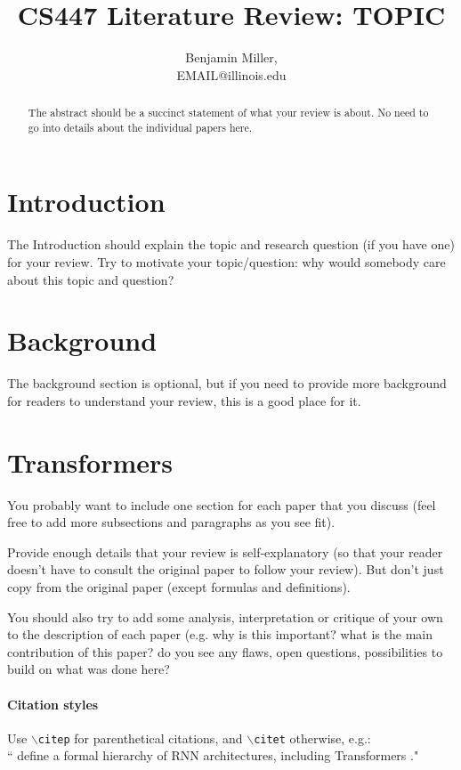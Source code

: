 \documentclass[letterpaper, 11pt]{article}
\title{CS447 Literature Review: TOPIC}
\author{Benjamin Miller,\\ EMAIL@illinois.edu}
\begin{document}
\maketitle

\begin{abstract}
The abstract should be a succinct statement of what your review is about. No need to go into details about the individual papers here. 
\end{abstract}

\section{Introduction}
\label{sec:introduction}
The Introduction should explain the topic and research question (if you have one) for your review. Try to motivate your topic/question: why would somebody care about this topic and question? 

\section{Background}
\label{sec:background}
The background section is optional, but if you need to provide more background for readers to understand your review, this is a good place for it. 


\section{Transformers}
\label{sec:transformers} 
You probably want to include one section for each paper that you discuss (feel free to add more subsections and paragraphs as you see fit). 

Provide enough details that your review is self-explanatory (so that your reader doesn't have to consult the original paper to follow your review). But don't just copy from the original paper (except formulas and definitions). 

You should also try to add some analysis, interpretation or critique of your own to the description of each paper (e.g. why is this important? what is the main contribution of this paper? do you see any flaws, open questions, possibilities to build on what was done here?

\paragraph{Citation styles}
Use \texttt{$\backslash$citep} for parenthetical citations, and  \texttt{$\backslash$citet} otherwise, e.g.:\hfill\\ 
``\citet{merrill-etal-2020-formal} define a formal hierarchy of RNN architectures, including Transformers \citep{NIPS2017_3f5ee243}."
\end{document}
